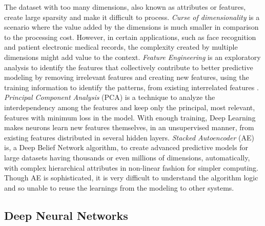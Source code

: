 \documentclass[sigconf]{acmart}
\begin{document}
	The dataset with too many dimensions, also known as attributes or features, create large sparsity and make it difficult to process. {\em Curse of dimensionality} is a scenario where the value added by the dimensions is much smaller in comparison to the processing cost. However, in certain applications, such as face recognition and patient electronic medical records, the complexity created by multiple dimensions might add value to the context. {\em Feature Engineering} is an exploratory analysis to identify the features that collectively contribute to better predictive modeling by removing irrelevant features and creating new features, using the training information to identify the patterns, from existing interrelated features \cite{JasonBrownlee2014}. {\em Principal Component Analysis} (PCA) is a technique to analyze the interdependency among the features and keep only the principal, most relevant, features with minimum loss in the model. With enough training, Deep Learning makes neurons learn new features themselves, in an unsupervised manner, from existing features distributed in several hidden layers. {\em Stacked Autoencoder} (AE) is, a Deep Belief Network algorithm, to create advanced predictive models for large datasets having thousands or even millions of dimensions, automatically, with complex hierarchical attributes in non-linear fashion for simpler computing. Though AE is sophisticated, it is very difficult to understand the algorithm logic and so unable to reuse the learnings from the modeling to other systems. 
		
	
	\subsection{Deep Neural Networks}
	
\end{document}
